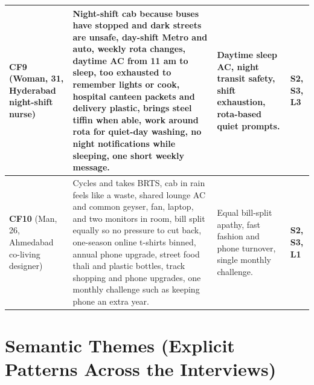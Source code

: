 \documentclass[12pt, a4paper]{article}
\begin{document}
\begin{longtable}{|>{\raggedright\arraybackslash}p{3.0cm}|>{\raggedright\arraybackslash}p{7.1cm}|>{\raggedright\arraybackslash}p{3.7cm}|>{\raggedright\arraybackslash}p{1.9cm}|}
\textbf{CF9} \cite{cf9} (Woman, 31, Hyderabad night-shift nurse) & 
Night-shift cab because buses have stopped and dark streets are unsafe, day-shift Metro and auto, weekly rota changes, daytime AC from 11 am to sleep, too exhausted to remember lights or cook, hospital canteen packets and delivery plastic, brings steel tiffin when able, work around rota for quiet-day washing, no night notifications while sleeping, one short weekly message. & 
Daytime sleep AC, night transit safety, shift exhaustion, rota-based quiet prompts. & 
\textbf{S2, S3, L3} \\
\hline

\textbf{CF10} \cite{cf10} (Man, 26, Ahmedabad co-living designer) & 
Cycles and takes BRTS, cab in rain feels like a waste, shared lounge AC and common geyser, fan, laptop, and two monitors in room, bill split equally so no pressure to cut back, one-season online t-shirts binned, annual phone upgrade, street food thali and plastic bottles, track shopping and phone upgrades, one monthly challenge such as keeping phone an extra year. & 
Equal bill-split apathy, fast fashion and phone turnover, single monthly challenge. & 
\textbf{S2, S3, L1} \\
\hline
\end{longtable}

\section{Semantic Themes (Explicit Patterns Across the Interviews)}
\end{document}
